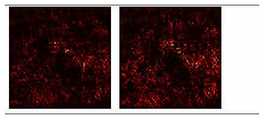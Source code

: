 \documentclass[preprint,12pt]{elsarticle}
\begin{document}
\begin{figure}[p]
\begin{tabular}{cccccc}
  \includegraphics[scale=\scale]{../visualizations/examples/imagenette/resnet18/active_saliency_map/2.png} & 
  \includegraphics[scale=\scale]{../visualizations/examples/imagenette/resnet18/inactive_saliency_map/2.png} \\
  

\end{tabular}
\end{figure}
\end{document}
